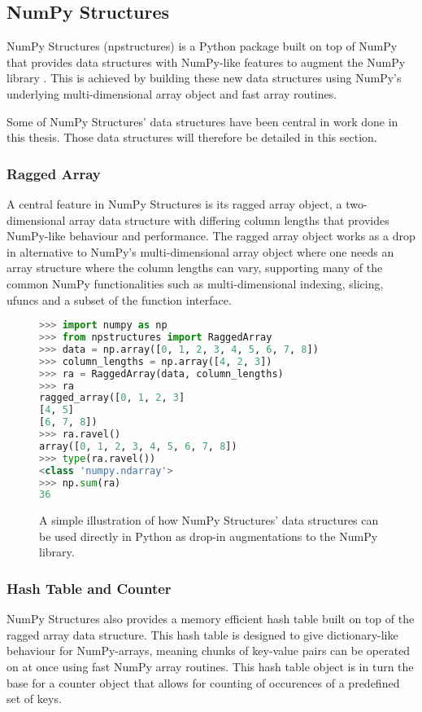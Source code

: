 \subsection{NumPy Structures} \label{background:numpy_structures}
NumPy Structures (npstructures) is a Python package built on top of NumPy that provides data structures with NumPy-like features to augment the NumPy library \cite{npstructures}.
This is achieved by building these new data structures using NumPy's underlying multi-dimensional array object and fast array routines.

Some of NumPy Structures' data structures have been central in work done in this thesis.
Those data structures will therefore be detailed in this section.

\subsubsection{Ragged Array}
A central feature in NumPy Structures is its ragged array object, a two-dimensional array data structure with differing column lengths that provides NumPy-like behaviour and performance.
The ragged array object works as a drop in alternative to NumPy's multi-dimensional array object where one needs an array structure where the column lengths can vary, supporting many of the common NumPy functionalities such as multi-dimensional indexing, slicing, ufuncs and a subset of the function interface.
\begin{figure}[H]
\begin{lstlisting}[language=Python,style=console]
>>> import numpy as np
>>> from npstructures import RaggedArray
>>> data = np.array([0, 1, 2, 3, 4, 5, 6, 7, 8])
>>> column_lengths = np.array([4, 2, 3])
>>> ra = RaggedArray(data, column_lengths)
>>> ra
ragged_array([0, 1, 2, 3]
[4, 5]
[6, 7, 8])
>>> ra.ravel()
array([0, 1, 2, 3, 4, 5, 6, 7, 8])
>>> type(ra.ravel())
<class 'numpy.ndarray'>
>>> np.sum(ra)
36
\end{lstlisting}
\caption{
  A simple illustration of how NumPy Structures' data structures can be used directly in Python as drop-in augmentations to the NumPy library.
}
\label{background:numpy_structures:ragged_array:figure}
\end{figure}

\subsubsection{Hash Table and Counter}
NumPy Structures also provides a memory efficient hash table built on top of the ragged array data structure.
This hash table is designed to give dictionary-like behaviour for NumPy-arrays, meaning chunks of key-value pairs can be operated on at once using fast NumPy array routines.
This hash table object is in turn the base for a counter object that allows for counting of occurences of a predefined set of keys.

